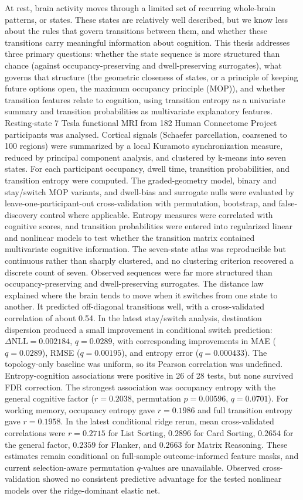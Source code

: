 \documentclass[12pt,a4paper]{report}
\begin{document}
At rest, brain activity moves through a limited set of recurring whole-brain patterns, or states. These states are relatively well described, but we know less about the rules that govern transitions between them, and whether these transitions carry meaningful information about cognition. This thesis addresses three primary questions: whether the state sequence is more structured than chance (against occupancy-preserving and dwell-preserving surrogates), what governs that structure (the geometric closeness of states, or a principle of keeping future options open, the maximum occupancy principle (MOP)), and whether transition features relate to cognition, using transition entropy as a univariate summary and transition probabilities as multivariate explanatory features. Resting-state 7 Tesla functional MRI from 182 Human Connectome Project participants was analysed. Cortical signals (Schaefer parcellation, coarsened to 100 regions) were summarized by a local Kuramoto synchronization measure, reduced by principal component analysis, and clustered by k-means into seven states. For each participant occupancy, dwell time, transition probabilities, and transition entropy were computed. The graded-geometry model, binary and stay/switch MOP variants, and dwell-bias and surrogate nulls were evaluated by leave-one-participant-out cross-validation with permutation, bootstrap, and false-discovery control where applicable. Entropy measures were correlated with cognitive scores, and transition probabilities were entered into regularized linear and nonlinear models to test whether the transition matrix contained multivariate cognitive information. The seven-state atlas was reproducible but continuous rather than sharply clustered, and no clustering criterion recovered a discrete count of seven. Observed sequences were far more structured than occupancy-preserving and dwell-preserving surrogates. The distance law explained where the brain tends to move when it switches from one state to another. It predicted off-diagonal transitions well, with a cross-validated correlation of about 0.54. In the latest stay/switch analysis, destination dispersion produced a small improvement in conditional switch prediction: $\Delta\mathrm{NLL}=0.002184$, $q=0.0289$, with corresponding improvements in MAE ($q=0.0289$), RMSE ($q=0.00195$), and entropy error ($q=0.000433$). The topology-only baseline was uniform, so its Pearson correlation was undefined. Entropy-cognition associations were positive in 26 of 28 tests, but none survived FDR correction. The strongest association was occupancy entropy with the general cognitive factor ($r=0.2038$, permutation $p=0.00596$, $q=0.0701$). For working memory, occupancy entropy gave $r=0.1986$ and full transition entropy gave $r=0.1958$. In the latest conditional ridge rerun, mean cross-validated correlations were $r=0.2715$ for List Sorting, $0.2896$ for Card Sorting, $0.2654$ for the general factor, $0.2359$ for Flanker, and $0.2663$ for Matrix Reasoning. These estimates remain conditional on full-sample outcome-informed feature masks, and current selection-aware permutation $q$-values are unavailable. Observed cross-validation showed no consistent predictive advantage for the tested nonlinear models over the ridge-dominant elastic net.
\end{document}
